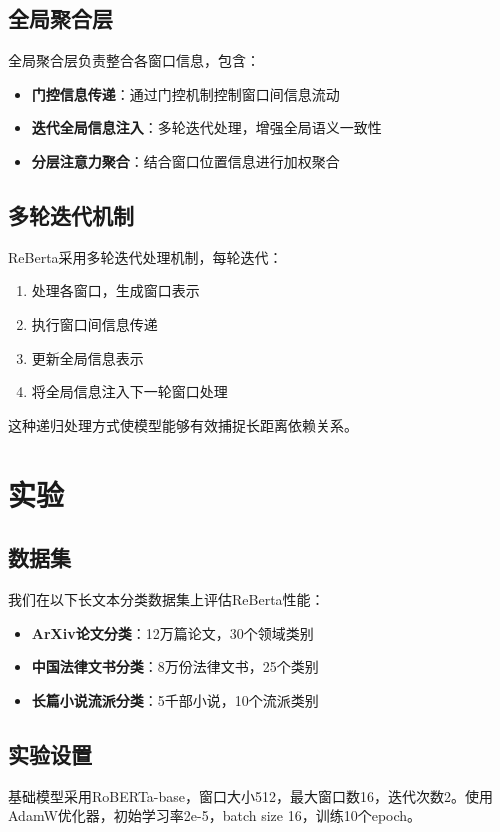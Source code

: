 \documentclass[10pt,twocolumn,letterpaper]{article}
\begin{document}
\subsection{全局聚合层}
全局聚合层负责整合各窗口信息，包含：
\begin{itemize}
    \item \textbf{门控信息传递}：通过门控机制控制窗口间信息流动
    \item \textbf{迭代全局信息注入}：多轮迭代处理，增强全局语义一致性
    \item \textbf{分层注意力聚合}：结合窗口位置信息进行加权聚合
\end{itemize}

\subsection{多轮迭代机制}
ReBerta采用多轮迭代处理机制，每轮迭代：
\begin{enumerate}
    \item 处理各窗口，生成窗口表示
    \item 执行窗口间信息传递
    \item 更新全局信息表示
    \item 将全局信息注入下一轮窗口处理
\end{enumerate}
这种递归处理方式使模型能够有效捕捉长距离依赖关系。

\section{实验}
\subsection{数据集}
我们在以下长文本分类数据集上评估ReBerta性能：
\begin{itemize}
    \item \textbf{ArXiv论文分类}：12万篇论文，30个领域类别
    \item \textbf{中国法律文书分类}：8万份法律文书，25个类别
    \item \textbf{长篇小说流派分类}：5千部小说，10个流派类别
\end{itemize}

\subsection{实验设置}
基础模型采用RoBERTa-base，窗口大小512，最大窗口数16，迭代次数2。使用AdamW优化器，初始学习率2e-5，batch size 16，训练10个epoch。
\end{document}
